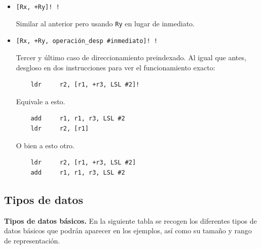 \begin{descript}
\begin{itemize}
  \item{\tt [Rx, +Ry]! \newline
            [Rx, -Ry]! \newline}

    Similar al anterior pero usando {\tt Ry} en lugar de inmediato.

  \item{\tt [Rx, +Ry, operación\_desp \#inmediato]! ! \newline}

    Tercer y último caso de direccionamiento preindexado. Al igual que
    antes, desgloso en dos instrucciones para ver el funcionamiento exacto:

\begin{lstlisting}
    ldr     r2, [r1, +r3, LSL #2]!
\end{lstlisting}

    Equivale a esto.

\begin{lstlisting}
    add     r1, r1, r3, LSL #2
    ldr     r2, [r1]
\end{lstlisting}

    O bien a esto otro.

\begin{lstlisting}
    ldr     r2, [r1, +r3, LSL #2]
    add     r1, r1, r3, LSL #2
\end{lstlisting}
\end{itemize}


\subsection{Tipos de datos}

\vspace{0.25cm}
{\bf Tipos de datos básicos.} En la siguiente tabla se recogen los diferentes tipos de datos básicos
 que podrán aparecer en los ejemplos, así como su tamaño y  rango de
representación.


\end{descript}
